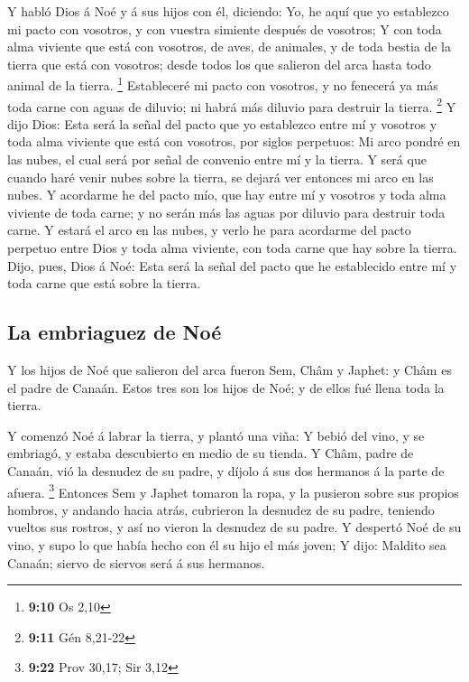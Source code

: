  Y habló Dios á Noé y á sus hijos con él, diciendo:
 Yo, he aquí que yo establezco mi pacto con vosotros, y con
vuestra simiente después de vosotros;  Y con toda alma
viviente que está con vosotros, de aves, de animales, y de toda bestia
de la tierra que está con vosotros; desde todos los que salieron del
arca hasta todo animal de la tierra. \footnote{\textbf{9:10} Os 2,10}
 Estableceré mi pacto con vosotros, y no fenecerá ya más
toda carne con aguas de diluvio; ni habrá más diluvio para destruir la
tierra. \footnote{\textbf{9:11} Gén 8,21-22}  Y dijo Dios:
Esta será la señal del pacto que yo establezco entre mí y vosotros y
toda alma viviente que está con vosotros, por siglos perpetuos:
 Mi arco pondré en las nubes, el cual será por señal de
convenio entre mí y la tierra.  Y será que cuando haré
venir nubes sobre la tierra, se dejará ver entonces mi arco en las
nubes.  Y acordarme he del pacto mío, que hay entre mí y
vosotros y toda alma viviente de toda carne; y no serán más las aguas
por diluvio para destruir toda carne.  Y estará el arco en
las nubes, y verlo he para acordarme del pacto perpetuo entre Dios y
toda alma viviente, con toda carne que hay sobre la tierra.
 Dijo, pues, Dios á Noé: Esta será la señal del pacto que
he establecido entre mí y toda carne que está sobre la tierra.

\hypertarget{la-embriaguez-de-nouxe9}{%
\subsection{La embriaguez de Noé}\label{la-embriaguez-de-nouxe9}}

 Y los hijos de Noé que salieron del arca fueron Sem, Châm
y Japhet: y Châm es el padre de Canaán.  Estos tres son los
hijos de Noé; y de ellos fué llena toda la tierra.

 Y comenzó Noé á labrar la tierra, y plantó una viña:
 Y bebió del vino, y se embriagó, y estaba descubierto en
medio de su tienda.  Y Châm, padre de Canaán, vió la
desnudez de su padre, y díjolo á sus dos hermanos á la parte de afuera.
\footnote{\textbf{9:22} Prov 30,17; Sir 3,12}  Entonces Sem
y Japhet tomaron la ropa, y la pusieron sobre sus propios hombros, y
andando hacia atrás, cubrieron la desnudez de su padre, teniendo vueltos
sus rostros, y así no vieron la desnudez de su padre.  Y
despertó Noé de su vino, y supo lo que había hecho con él su hijo el más
joven;  Y dijo: Maldito sea Canaán; siervo de siervos será
á sus hermanos.

